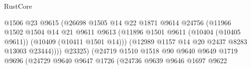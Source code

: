 \begin{lexlean}{RustCore}
\begin{coremodule}
                                              @1506
                                              @23
                                              @9615
                                              (@26698
                                                @1505
                                                @14
                                                @22
                                                @1871
                                                @9614
                                                @24756
                                                (@11966
                                                  @1502
                                                  @1504
                                                  @14
                                                  @21
                                                  @9611
                                                  @9613
                                                  (@11896
                                                    @1501
                                                    @9611
                                                    (@10404 (@10405 @9611))
                                                    (@10409 (@10411 @1501 @14)))
                                                  (@12989
                                                    @1157
                                                    @14
                                                    @20
                                                    @2437
                                                    @8283
                                                    @13003
                                                    @23444))))
                                            @23325)
                                          (@24719
                                            @1510
                                            @1518
                                            @90
                                            @9640
                                            @9649
                                            @1719
                                            @9696
                                            (@24729
                                              @9640
                                              @9647
                                              @1726
                                              (@24736
                                                @9639
                                                @9646
                                                @1697
                                                @9622

\end{coremodule}
\end{lexlean}
